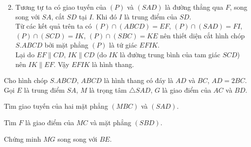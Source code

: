 \begin{bt}
{\begin{enumerate}
			\setcounter{enumi}{1}
			\item Tương tự ta có giao tuyến của $(P)$ và $(SAD)$ là đường thẳng qua $F$, song song với $SA$, cắt $SD$ tại $I$. Khi đó $I$ là trung điểm của $SD$.\\
			Từ các kết quả trên ta có $(P)\cap (ABCD)=EF$, $(P)\cap (SAD)=FI$, $(P)\cap (SCD)=IK$, $(P)\cap (SBC)=KE$ nên thiết diện cắt hình chóp $S.ABCD$ bởi mặt phẳng $(P)$ là tứ giác $EFIK$.\\
			Lại do $EF\parallel CD$, $IK\parallel CD$ (do $IK$ là đường trung bình của tam giác $SCD$) nên $IK\parallel EF$. Vậy $EFIK$ là hình thang.
		\end{enumerate}
	}
\end{bt}

\begin{bt}%
Cho hình chóp $ S.ABCD $, $ ABCD $ là hình thang có đáy là $ AD $ và $ BC $, $ AD = 2BC $.
Gọi $ E $ là trung điểm $ SA $, $ M $ là trọng tâm $ \triangle SAD $, $ G $ là giao điểm của $ AC $ và $ BD $.
\begin{listEX}[1]
	\item Tìm giao tuyến của hai mặt phẳng $ (MBC) $ và $ (SAD) $.
	\item Tìm $ F $ là giao điểm của $ MC $ và mặt phẳng $ (SBD) $.
	\item Chứng minh $ MG $ song song với $ BE $.
\end{listEX}
\end{bt}
